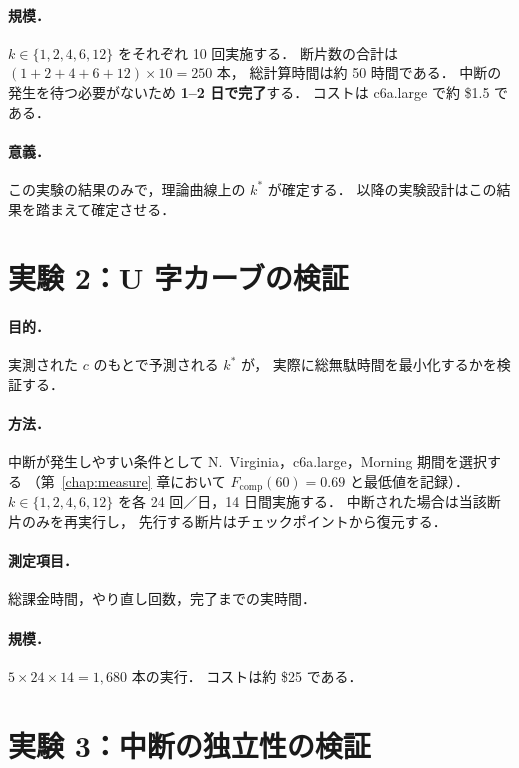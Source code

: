 \documentclass[11pt,a4paper]{ltjsreport}
\newcommand{\Fcomp}{F_{\mathrm{comp}}}
\begin{document}
\paragraph{規模．}
$k \in \{1,2,4,6,12\}$ をそれぞれ 10 回実施する．
断片数の合計は $(1+2+4+6+12)\times 10 = 250$ 本，
総計算時間は約 50 時間である．
中断の発生を待つ必要がないため \textbf{1--2 日で完了}する．
コストは c6a.large で約 \$1.5 である．

\paragraph{意義．}
この実験の結果のみで，理論曲線上の $k^{*}$ が確定する．
以降の実験設計はこの結果を踏まえて確定させる．

\section{実験 2：U 字カーブの検証}

\paragraph{目的．}
実測された $c$ のもとで予測される $k^{*}$ が，
実際に総無駄時間を最小化するかを検証する．

\paragraph{方法．}
中断が発生しやすい条件として
N.~Virginia，c6a.large，Morning 期間を選択する
（第~\ref{chap:measure} 章において $\Fcomp(60) = 0.69$ と最低値を記録）．
$k \in \{1,2,4,6,12\}$ を各 24 回／日，14 日間実施する．
中断された場合は当該断片のみを再実行し，
先行する断片はチェックポイントから復元する．

\paragraph{測定項目．}
総課金時間，やり直し回数，完了までの実時間．

\paragraph{規模．}
$5 \times 24 \times 14 = 1{,}680$ 本の実行．
コストは約 \$25 である．

\section{実験 3：中断の独立性の検証}
\end{document}
